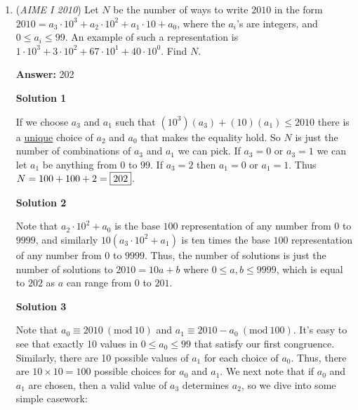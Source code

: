 \begin{enumerate}
 


 \textbf{Remark} It is tempting to add the equations and then use the well-known factorization $x^3+y^3+z^3-3xyz = (x+y+z)(x^2+y^2+z^2-xy-xz-yz)$. Unfortunately such a factorization is just a red herring: it doesn't give much information on $a^3+b^3+c^3$.

 \textbf{Another Remark} The real problem with adding the equations is that $x, y, z$ are real numbers based on the problem, but the adding trick only works when $x, y, z$ are integers.

 


	\item (\textit{AIME I 2010}) Let $N$ be the number of ways to write $2010$ in the form $2010 = a_3 \cdot 10^3 + a_2 \cdot 10^2 + a_1 \cdot 10 + a_0$, where the $a_i$'s are integers, and $0 \le a_i \le 99$. An example of such a representation is $1\cdot 10^3 + 3\cdot 10^2 + 67\cdot 10^1 + 40\cdot 10^0$. Find $N$.


 
 \textbf{Answer: }202



\textbf{Solution 1}

If we choose $a_3$ and $a_1$ such that $(10^3)(a_3) + (10)(a_1) \leq 2010$ there is a \href{https://artofproblemsolving.com/wiki/index.php?title=Bijection}{unique} choice of $a_2$ and $a_0$ that makes the equality hold.  So $N$ is just the number of combinations of $a_3$ and $a_1$ we can pick.  If $a_3 = 0$ or $a_3 = 1$ we can let $a_1$ be anything from $0$ to $99$.  If $a_3 = 2$ then $a_1 = 0$ or $a_1 = 1$.  Thus $N = 100 + 100 + 2 = \fbox{202}$.

 



\textbf{Solution 2}

Note that $a_2\cdot 10^2 + a_0$ is the base $100$ representation of any number from $0$ to $9999$, and similarly $10(a_3\cdot 10^2 + a_1)$ is ten times the base $100$ representation of any number from $0$ to $9999$. Thus, the number of solutions is just the number of solutions to $2010 = 10a+b$ where $0\le a, b\le 9999$, which is equal to $\boxed{202}$ as $a$ can range from $0$ to $201$.

 



\textbf{Solution 3}

Note that $a_0 \equiv 2010\ (\textrm{mod}\ 10)$ and $a_1 \equiv 2010 - a_0\  (\textrm{mod}\ 100)$. It's easy to see that exactly 10 values in $0 \leq a_0 \leq 99$ that satisfy our first congruence. Similarly, there are 10 possible values of $a_1$ for each choice of $a_0$. Thus, there are $10 \times 10 = 100$ possible choices for $a_0$ and $a_1$. We next note that if $a_0$ and $a_1$ are chosen, then a valid value of $a_3$ determines $a_2$, so we dive into some simple casework:


\end{enumerate}
